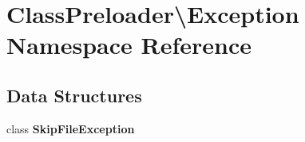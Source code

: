 \section{Class\+Preloader\textbackslash{}Exception Namespace Reference}
\label{namespace_class_preloader_1_1_exception}
\subsection*{Data Structures}
\begin{DoxyCompactItemize}
\item 
class {\bf Skip\+File\+Exception}
\end{DoxyCompactItemize}
